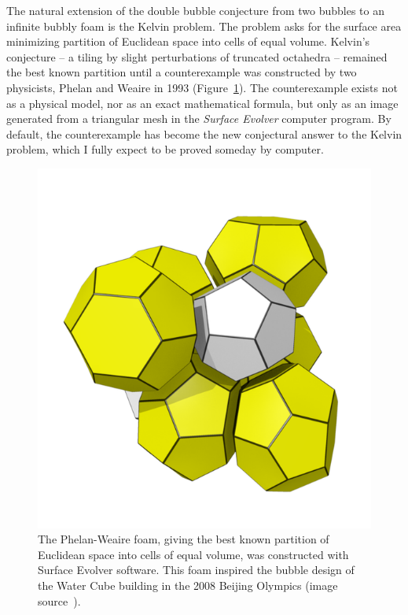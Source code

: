 \documentclass{llncs}
\begin{document}
The natural extension of the double bubble conjecture from two bubbles
to an infinite bubbly foam is the Kelvin problem.  The problem asks
for the surface area minimizing partition of Euclidean space into
cells of equal volume.  Kelvin's conjecture -- a tiling by slight
perturbations of truncated octahedra -- remained the best known
partition until a counterexample was constructed by two physicists,
Phelan and Weaire in 1993 (Figure~\ref{fig:PW}).  The counterexample
exists not as a physical model, nor as an exact mathematical formula,
but only as an image generated from a triangular mesh in the {\it
  Surface Evolver} computer program.  By default, the counterexample
has become the new conjectural answer to the Kelvin problem, which I
fully expect to be proved someday by computer.

\begin{figure}[h!]
  \centering
\includegraphics[scale=0.28]{557px-Foam_-_Weaire-Phelan_structure.png}
\caption{The Phelan-Weaire foam, giving the best known partition of
  Euclidean space into cells of equal volume, was constructed with
  Surface Evolver software.  This foam inspired the bubble design of
  the Water Cube building in the 2008 Beijing Olympics (image
  source~\cite{phelan-graphic}).  }
\label{fig:PW}
\end{figure}
\end{document}
